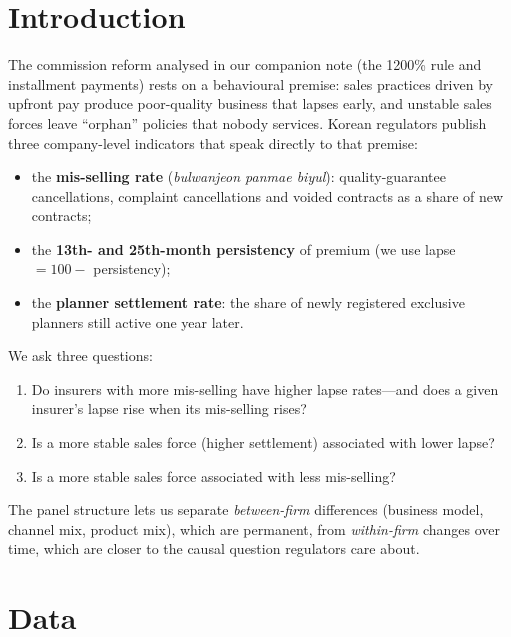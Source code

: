 \documentclass[11pt,a4paper]{article}
\begin{document}
\section{Introduction}
The commission reform analysed in our companion note (the 1200\% rule and installment payments) rests on a
behavioural premise: sales practices driven by upfront pay produce poor-quality business that lapses early,
and unstable sales forces leave ``orphan'' policies that nobody services. Korean regulators publish three
company-level indicators that speak directly to that premise:
\begin{itemize}
  \item the \textbf{mis-selling rate} (\emph{bulwanjeon panmae biyul}): quality-guarantee cancellations,
        complaint cancellations and voided contracts as a share of new contracts;
  \item the \textbf{13th- and 25th-month persistency} of premium (we use lapse $=100-$ persistency);
  \item the \textbf{planner settlement rate}: the share of newly registered exclusive planners still active one year later.
\end{itemize}
We ask three questions:
\begin{enumerate}
  \item[\textbf{Q1}] Do insurers with more mis-selling have higher lapse rates---and does a given insurer's lapse rise when its mis-selling rises?
  \item[\textbf{Q2}] Is a more stable sales force (higher settlement) associated with lower lapse?
  \item[\textbf{Q3}] Is a more stable sales force associated with less mis-selling?
\end{enumerate}
The panel structure lets us separate \emph{between-firm} differences (business model, channel mix, product mix),
which are permanent, from \emph{within-firm} changes over time, which are closer to the causal question regulators care about.

\section{Data}
\end{document}
